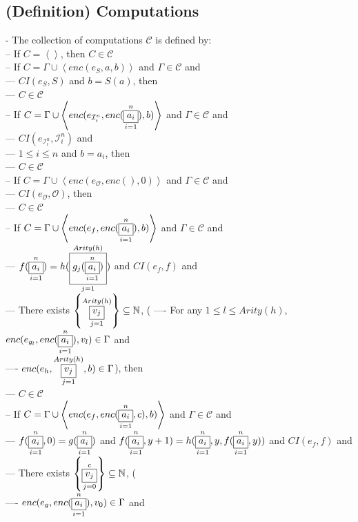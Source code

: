 \documentclass{book}
\newcommand{\set}[1]{\left\{ #1 \right\}}
\newcommand{\seq}[1]{\left\langle #1 \right\rangle}
\newcommand{\vdc}[3]{\underset{#2}{\overset{#3}{\fbox{$#1$}}}}
\begin{document}
\subsection{(Definition) Computations} %
	- The collection of computations $\mathcal{C}$ is defined by: \\
		-- If $C = \seq{}$, then $C \in \mathcal{C}$ \\
		-- If $C = \Gamma \cup \seq{enc(e_S, a, b)}$ and $\Gamma \in \mathcal{C}$ and \\
			--- $CI(e_S, S)$ and $b = S(a)$, then \\
			--- $C \in \mathcal{C}$ \\
		-- If $C = \Gamma \cup \seq{enc(e_{\mathcal{I}_i^n}, enc(\vdc{a_i}{i=1}{n}), b)}$ and $\Gamma \in \mathcal{C}$ and \\
			--- $CI(e_{\mathcal{I}_i^n}, \mathcal{I}_i^n)$ and \\
			--- $1 \leq i \leq n$ and $b = a_i$, then \\
			--- $C \in \mathcal{C}$ \\
		-- If $C = \Gamma \cup \seq{enc(e_\mathcal{O}, enc(), 0)}$ and $\Gamma \in \mathcal{C}$ and \\
			--- $CI(e_\mathcal{O}, \mathcal{O})$, then \\
			--- $C \in \mathcal{C}$ \\
		-- If $C = \Gamma \cup \seq{enc(e_f, enc(\vdc{a_i}{i=1}{n}), b)}$ and $\Gamma \in \mathcal{C}$ and \\
			--- $f(\vdc{a_i}{i=1}{n}) = h(\vdc{g_j(\vdc{a_i}{i=1}{n})}{j=1}{Arity(h)})$ and $CI(e_f, f)$ and \\
			--- There exists $\set{\vdc{v_j}{j=1}{Arity(h)}} \subseteq \mathbb{N}$, (
				---- For any $1 \leq l \leq Arity(h)$, $enc(e_{g_l}, enc(\vdc{a_i}{i=1}{n}), v_l) \in \Gamma$ and \\
				---- $enc(e_h, \vdc{v_j}{j=1}{Arity(h)}, b) \in \Gamma$), then \\
			--- $C \in \mathcal{C}$ \\
		-- If $C = \Gamma \cup \seq{enc(e_f, enc(\vdc{a_i}{i=1}{n}, c), b)}$ and $\Gamma \in \mathcal{C}$ and \\
			--- $f(\vdc{a_i}{i=1}{n}, 0) = g(\vdc{a_i}{i=1}{n})$ and $f(\vdc{a_i}{i=1}{n}, y+1) = h(\vdc{a_i}{i=1}{n}, y, f(\vdc{a_i}{i=1}{n}, y))$ and $CI(e_f, f)$ and \\
			--- There exists $\set{\vdc{v_j}{j=0}{c}} \subseteq \mathbb{N}$, ( \\
				---- $enc(e_g, enc(\vdc{a_i}{i=1}{n}), v_0) \in \Gamma$ and \\
\end{document}
